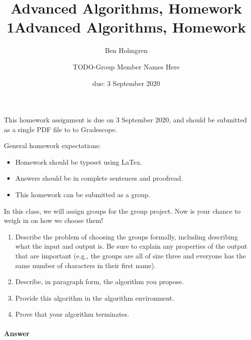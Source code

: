 \documentclass{article}
\title{Advanced Algorithms, Homework 1}
\author{Ben Holmgren}
\title{Advanced Algorithms, Homework \hwnum}
\author{TODO-Group Member Names Here}
\date{due: 3 September 2020}
\begin{document}
\maketitle

This homework assignment is due on 3 September 2020, and should be
submitted as a single PDF file to to Gradescope.

General homework expectations:
\begin{itemize}
    \item Homework should be typeset using LaTex.
    \item Answers should be in complete sentences and proofread.
    \item This homework can be submitted as a group.
\end{itemize}

\nextprob
{}

In this class, we will assign groups for the group project.  Now is your chance
to weigh in on how we choose them!
\begin{enumerate}
    \item Describe the problem of choosing the groups formally, including
        describing what the input and output is.  Be sure to explain any
        properties of the output that are important (e.g., the groups are all of
        size three and everyone has the same number of characters in their first
        name).
    \item Describe, in paragraph form, the algorithm you propose.
    \item Provide this algorithm in the algorithm environment.
    \item Prove that your algorithm terminates.
\end{enumerate}

\paragraph{Answer}

\end{document}
